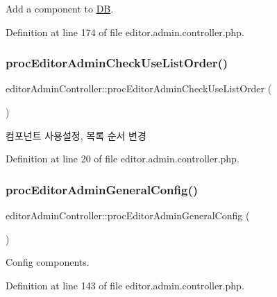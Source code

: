 Add a component to \hyperlink{classDB}{DB}. 



Definition at line 174 of file editor.\+admin.\+controller.\+php.

\hypertarget{classeditorAdminController_a00e9dceb8f8bc86baf8edbac76e3d5fd}{}\label{classeditorAdminController_a00e9dceb8f8bc86baf8edbac76e3d5fd} 
\subsubsection{\texorpdfstring{proc\+Editor\+Admin\+Check\+Use\+List\+Order()}{procEditorAdminCheckUseListOrder()}}
{\footnotesize\ttfamily editor\+Admin\+Controller\+::proc\+Editor\+Admin\+Check\+Use\+List\+Order (\begin{DoxyParamCaption}{ }\end{DoxyParamCaption})}



컴포넌트 사용설정, 목록 순서 변경 



Definition at line 20 of file editor.\+admin.\+controller.\+php.

\hypertarget{classeditorAdminController_ad24e312c55f5bd02a7d7e03dad843157}{}\label{classeditorAdminController_ad24e312c55f5bd02a7d7e03dad843157} 
\subsubsection{\texorpdfstring{proc\+Editor\+Admin\+General\+Config()}{procEditorAdminGeneralConfig()}}
{\footnotesize\ttfamily editor\+Admin\+Controller\+::proc\+Editor\+Admin\+General\+Config (\begin{DoxyParamCaption}{ }\end{DoxyParamCaption})}



Config components. 



Definition at line 143 of file editor.\+admin.\+controller.\+php.


